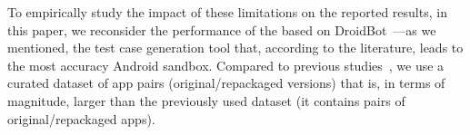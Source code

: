 

To empirically study the impact of these limitations on the reported results, in this paper, we reconsider the performance of the \mas based on
DroidBot~\cite{DBLP:conf/icse/LiYGC17}---as we mentioned, the test case generation tool that, according to the literature, leads to the most accuracy Android sandbox. 
Compared to previous studies~\cite{DBLP:conf/wcre/BaoLL18,DBLP:conf/scam/CostaMCMVBC20},
we use a curated dataset of app pairs (original/repackaged versions) that is, in terms of magnitude, larger than the previously used
dataset (it contains \apps pairs of original/repackaged apps).
 
